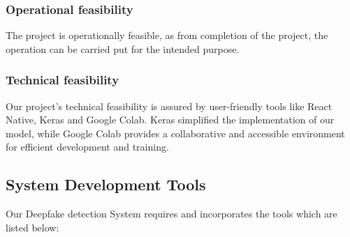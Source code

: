 \subsubsection{Operational feasibility}
The project is operationally feasible, as from  completion of the project, the operation can be carried put for the intended purpose.

\subsubsection{Technical feasibility}
Our project's technical feasibility is assured by user-friendly tools like React Native, Keras and Google Colab. Keras simplified the implementation of our model, while Google Colab provides a collaborative and accessible environment for efficient development and training. 
\newpage
\subsection{System Development Tools}
Our Deepfake detection System requires and incorporates the tools which are listed below:
